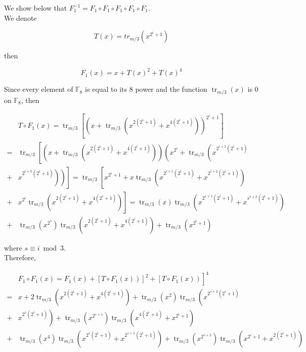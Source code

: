 \documentclass[10pt]{article}
\begin{document}
We show below that $F_{1}^{-1}=F_{1} \circ F_{1} \circ F_{1} \circ F_{1} \circ F_{1}$.\\
We denote

$$
T(x)=t r_{m / 3}\left(x^{2^{i}+1}\right)
$$

then

$$
F_{1}(x)=x+T(x)^{2}+T(x)^{4}
$$

Since every element of $\mathbb{F}_{8}$ is equal to its 8 power and the function $\operatorname{tr}_{m / 3}(x)$ is 0 on $\mathbb{F}_{8}$, then

$$
\begin{aligned}
& T \circ F_{1}(x)=\operatorname{tr}_{m / 3}\left[\left(x+\operatorname{tr}_{m / 3}\left(x^{2\left(2^{i}+1\right)}+x^{4\left(2^{i}+1\right)}\right)\right)^{2^{i}+1}\right] \\
= & \operatorname{tr}_{m / 3}\left[( x + \operatorname { t r } _ { m / 3 } ( x ^ { 2 ( 2 ^ { i } + 1 ) } + x ^ { 4 ( 2 ^ { i } + 1 ) } ) ) \left(x^{2^{i}}+\operatorname{tr}_{m / 3}\left(x^{2^{i+1}\left(2^{i}+1\right)}\right.\right.\right. \\
+ & \left.\left.\left.x^{2^{i+2}\left(2^{i}+1\right)}\right)\right)\right]=\operatorname{tr}_{m / 3}\left[x^{2^{i}+1}+x \operatorname{tr}_{m / 3}\left(x^{2^{i+1}\left(2^{i}+1\right)}+x^{2^{i+2}\left(2^{i}+1\right)}\right)\right. \\
+ & \left.x^{2^{i}} \operatorname{tr}_{m / 3}\left(x^{2\left(2^{i}+1\right)}+x^{4\left(2^{i}+1\right)}\right)\right]=\operatorname{tr}_{m / 3}(x) \operatorname{tr}_{m / 3}\left(x^{2^{s+1}\left(2^{i}+1\right)}+x^{s^{s+2}\left(2^{i}+1\right)}\right) \\
+ & \operatorname{tr}_{m / 3}\left(x^{2^{s}}\right) \operatorname{tr}_{m / 3}\left(x^{2\left(2^{i}+1\right)}+x^{4\left(2^{i}+1\right)}\right)+\operatorname{tr}_{m / 3}\left(x^{2^{i}+1}\right)
\end{aligned}
$$

where $s \equiv i \bmod 3$.\\
Therefore,

$$
\begin{aligned}
& \left.\left.F_{1} \circ F_{1}(x)=F_{1}(x)+\left[T \circ F_{1}(x)\right)\right]^{2}+\left[T \circ F_{1}(x)\right)\right]^{4} \\
= & x+2 \operatorname{tr}_{m / 3}\left(x^{2\left(2^{i}+1\right)}+x^{4\left(2^{i}+1\right)}\right)+\operatorname{tr}_{m / 3}\left(x^{2}\right) \operatorname{tr}_{m / 3}\left(x^{2^{s+2}\left(2^{i}+1\right)}\right. \\
+ & \left.x^{2^{s}\left(2^{i}+1\right)}\right)+\operatorname{tr}_{m / 3}\left(x^{2^{s+1}}\right) \operatorname{tr}_{m / 3}\left(x^{4\left(2^{i}+1\right)}+x^{2^{i}+1}\right) \\
+ & \operatorname{tr}_{m / 3}\left(x^{4}\right) \operatorname{tr}_{m / 3}\left(x^{2^{s}\left(2^{i}+1\right)}+x^{2^{s+1}\left(2^{i}+1\right)}\right)+\operatorname{tr}_{m / 3}\left(x^{2^{s+2}}\right) \operatorname{tr}_{m / 3}\left(x^{2^{i}+1}+x^{2\left(2^{i}+1\right)}\right)
\end{aligned}
$$
\end{document}
